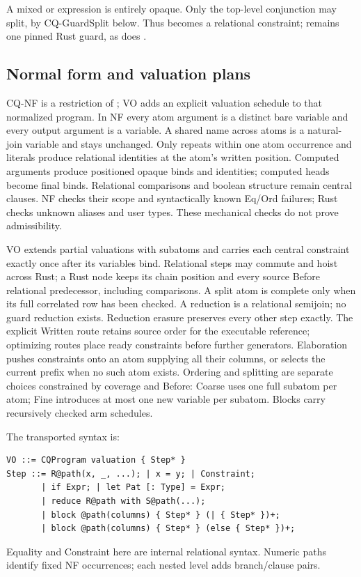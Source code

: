 A mixed \code{||} or \code{!} expression is entirely opaque. Only the top-level
conjunction may split, by CQ-GuardSplit below. Thus 
becomes a relational constraint;  remains one
pinned Rust guard, as does .

\subsection{Normal form and valuation plans}
\label{sec:nf-vo}
CQ-NF is a restriction of ; VO adds an explicit valuation
schedule to that normalized program. In NF every atom argument is a distinct
bare variable and every output argument is a variable. A shared name across
atoms is a natural-join variable and stays unchanged. Only repeats within one
atom occurrence and
literals produce relational identities at the atom's written position.
Computed arguments produce positioned opaque binds and identities; computed
heads become final binds. Relational comparisons and boolean structure remain
central clauses. NF checks their scope and syntactically known Eq/Ord failures;
Rust checks unknown aliases and user types. These mechanical checks do not
prove admissibility.

VO extends partial valuations with subatoms and carries each central constraint
exactly once after its variables bind. Relational steps may commute and hoist
across Rust; a Rust node keeps its chain position and every source Before
relational predecessor, including comparisons. A split atom is complete only
when its full correlated row has been checked. A reduction
 is a relational semijoin; no guard reduction
exists. Reduction erasure preserves every other step exactly. The explicit
Written route retains source order for the executable reference; optimizing
routes place ready constraints before further generators. Elaboration pushes
constraints onto an atom supplying all their columns, or selects the current
prefix when no such atom exists.
Ordering and splitting are separate choices constrained by coverage and
Before: Coarse uses one full subatom per atom; Fine introduces at most one
new variable per subatom. Blocks carry recursively checked arm schedules.

The transported syntax is:
\begin{lstlisting}
VO ::= CQProgram valuation { Step* }
Step ::= R@path(x, _, ...); | x = y; | Constraint;
       | if Expr; | let Pat [: Type] = Expr;
       | reduce R@path with S@path(...);
       | block @path(columns) { Step* } (| { Step* })+;
       | block @path(columns) { Step* } (else { Step* })+;
\end{lstlisting}
Equality and Constraint here are internal relational syntax. Numeric paths
identify fixed NF occurrences; each nested level adds branch/clause pairs.

